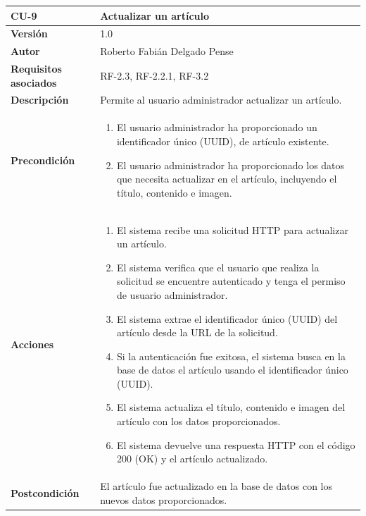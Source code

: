 \begin{table}[p]
	\centering
	\begin{tabularx}{\linewidth}{ p{} p{} }
		\toprule
		\textbf{CU-9}    & \textbf{Actualizar un artículo}\\
		\toprule
		\textbf{Versión}              & 1.0    \\
		\textbf{Autor}                & Roberto Fabián Delgado Pense \\
		\textbf{Requisitos asociados} & RF-2.3, RF-2.2.1, RF-3.2 \\ 
		\textbf{Descripción}          & Permite al usuario administrador actualizar un artículo. \\
		\textbf{Precondición}         & 
  \begin{enumerate}
			\def\labelenumi{\arabic{enumi}.}
			\tightlist
			\item   El usuario administrador ha proporcionado un identificador único (UUID), de artículo existente.
			\item   El usuario administrador ha proporcionado los datos que necesita actualizar en el artículo, incluyendo el título, contenido e imagen.
            \end{enumerate}\\
		\textbf{Acciones}             &
		\begin{enumerate}
			\def\labelenumi{\arabic{enumi}.}
			\tightlist
			\item El sistema recibe una solicitud HTTP para actualizar un artículo.
                \item El sistema verifica que el usuario que realiza la solicitud se encuentre autenticado y tenga el        permiso de usuario administrador.
			\item El sistema extrae el identificador único (UUID) del artículo desde la URL de la solicitud.
                \item Si la autenticación fue exitosa, el sistema busca en la base de datos el artículo usando el identificador único (UUID).
                \item El sistema actualiza el título, contenido e imagen del artículo con los datos proporcionados.
                \item El sistema devuelve una respuesta HTTP con el código 200 (OK) y el artículo actualizado.
            \end{enumerate}\\
		\textbf{Postcondición}        & El artículo fue actualizado en la base de datos con los nuevos datos                                           proporcionados. \\

\end{tabularx}
\end{table}
